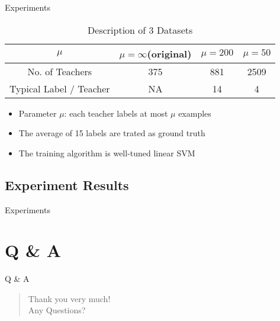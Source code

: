 \documentclass[10pt,table,mathserif]{beamer}
\begin{document}
\begin{frame}{Experiments}
  \begin{table}
    \centering
    \begin{tabular}{c|c|c|c}
     $\mu$ & $\mu = \infty$(original)  & $\mu = 200$ & $\mu = 50$ \\
     \hline
     No. of Teachers & 375 & 881 & 2509 \\
     Typical Label / Teacher & NA & 14 & 4 \\
    \end{tabular}
    \caption{Description of 3 Datasets}
  \end{table}
  \begin{itemize}
    \item Parameter \alert{$\mu$}: each teacher labels at most \alert{$\mu$} examples \pause
    \item The average of 15 labels are trated as ground truth \pause
    \item The training algorithm is \alert{well-tuned linear SVM}
  \end{itemize}
\end{frame}

\subsection{Experiment Results}
\begin{frame}{Experiments}
 
\end{frame}

\section{Q \& A}
\begin{frame}{Q \& A}
  \LARGE
  \begin{quote}
    \alert{Thank you very much!}\\
    \hspace{8ex} Any Questions?
  \end{quote}
\end{frame}
\end{document}
